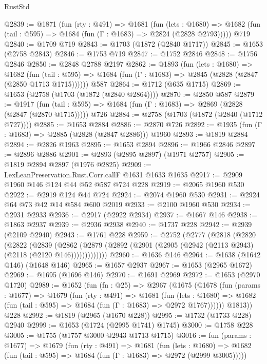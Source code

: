 \begin{lexlean}{RustStd}
\begin{coremodule}
@2839 := @1871
    (fun (rty : @491) =>
    @1681
      (fun (lets : @1680) =>
      @1682 (fun (tail : @595) => @1684 (fun (Γ : @1683) => @2824 (@2828 @2793)))))
    @719
@2840 := @1709 @719
@2843 := @1703 (@1872 (@2840 @1717))
@2845 := @1653 (@2758 @2843)
@2846 := @1753 @719
@2847 := @1752 @2846
@2848 := @1756 @2846
@2850 := @2848 @2788 @2197
@2862 := @1893
    (fun (lets : @1680) =>
    @1682
      (fun (tail : @595) => @1684 (fun (Γ : @1683) => @2845 (@2828 (@2847 (@2850 @1713 @1715))))))
    @587
@2864 := @1712 (@635 @1715)
@2869 := @1653 (@2758 (@1703 (@1872 (@2840 @2864))))
@2870 := @2850 @587
@2879 := @1917
    (fun (tail : @595) => @1684 (fun (Γ : @1683) => @2869 (@2828 (@2847 (@2870 @1715)))))
    @726
@2884 := @2758 (@1703 (@1872 (@2840 (@1712 @727))))
@2885 := @1653 @2884
@2886 := @2870 @726
@2892 := @1935 (fun (Γ : @1683) => @2885 (@2828 (@2847 @2886))) @1960
@2893 := @1819 @2884
@2894 := @2826 @1963
@2895 := @1653 @2894
@2896 := @1966 @2846
@2897 := @2896 @2886
@2901 := @2893 (@2895 @2897) (@1971 @2757)
@2905 := @1819 @2894 @2897 (@1976 @2825)
@2909 := LexLeanPreservation.Rust.Corr.callF @1631 @1633 @1635
@2917 := @2909 @1960 @146 @124 @44 @52 @587 @724 @228
@2919 := @2065 @1960 @530
@2922 := @2919 @124 @44 @724
@2924 := @2074 @1960 @530
@2931 := @2924 @64 @73 @42 @14 @584 @600 @2019
@2933 := @2100 @1960 @530
@2934 := @2931 @2933
@2936 := @2917 (@2922 @2934)
@2937 := @1667 @146
@2938 := @1863 @2937
@2939 := @2936 @2938
@2940 := @1737 @228
@2942 := @2939 (@2109 @2940)
@2943 := @1761 @228
@2959 := @2752
    (@2777
      (@2818
        (@2820
          (@2822
            (@2839
              (@2862
                (@2879 (@2892 (@2901 (@2905 (@2942 (@2113 @2943) (@2118 (@2120 @146)))))))))))))
@2960 := @1636 @146
@2964 := @1638 (@1642 @146) (@1648 @146)
@2965 := @1657 @2937
@2967 := @1653 (@2965 @1672)
@2969 := @1695 (@1696 @146)
@2970 := @1691 @2969
@2972 := @1653 (@2970 @1720)
@2989 := @1652
    (fun (fn : @25) =>
    @2967
      (@1675
        (@1678
          (fun (params : @1677) =>
          @1679
            (fun (rty : @491) =>
            @1681
              (fun (lets : @1680) =>
              @1682 (fun (tail : @595) => @1684 (fun (Γ : @1683) => @2972 @1767))))))
        @1813))
    @228
@2992 := @1819 (@2965 (@1670 @228))
@2995 := @1732 (@1733 @228) @2940
@2999 := @1653 (@1724 (@2995 @1741) @1745)
@3000 := @1758 @228
@3005 := @1755 (@1757 @3000 @2943 @1713 @1715)
@3016 := fun (params : @1677) =>
  @1679
    (fun (rty : @491) =>
    @1681
      (fun (lets : @1680) =>
      @1682 (fun (tail : @595) => @1684 (fun (Γ : @1683) => @2972 (@2999 @3005)))))

\end{coremodule}
\end{lexlean}
